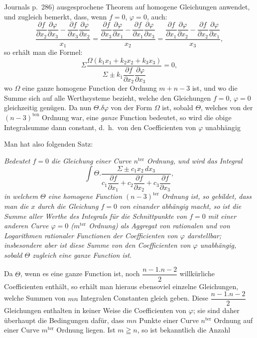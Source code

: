 \documentclass{article}
\begin{document}
Journals p.\ 286) ausgesprochene Theorem auf homogene Gleichungen anwendet, und zugleich bemerkt, dass, wenn $f = 0$, $\varphi = 0$, auch:
\[ \frac{\dfrac{\partial f}{\partial x_{2}}\dfrac{\partial \varphi}{\partial x_{3}} - \dfrac{\partial f}{\partial x_{3}}\dfrac{\partial \varphi}{\partial x_{2}}}{x_{1}} = \frac{\dfrac{\partial f}{\partial x_{3}}\dfrac{\partial \varphi}{\partial x_{1}} - \dfrac{\partial f}{\partial x_{1}}\dfrac{\partial \varphi}{\partial x_{3}}}{x_{2}} = \frac{\dfrac{\partial f}{\partial x_{1}}\dfrac{\partial \varphi}{\partial x_{2}} - \dfrac{\partial f}{\partial x_{2}}\dfrac{\partial \varphi}{\partial x_{1}}}{x_{3}}, \]
so erhält man die Formel:
\[ \Sigma\frac{\Omega(k_{1}x_{1} + k_{2}x_{2} + k_{3}x_{3})}{\Sigma\pm k_{1}\dfrac{\partial f}{\partial x_{2}}\dfrac{\partial \varphi}{\partial x_{3}}} = 0, \]
wo $\Omega$ eine ganze homogene Function der Ordnung $m+n-3$ ist, und wo die Summe sich auf alle Werthsysteme bezieht, welche den Gleichungen $f = 0$, $\varphi = 0$ gleichzeitig genügen. Da nun $\Theta.\delta\varphi$ von der Form $\Omega$ ist, sobald $\Theta$, welches von der $(n-3)^{\text{ten}}$ Ordnung war, eine \emph{ganze} Function bedeutet, so wird die obige Integralsumme dann constant, d.\ h.\ von den Coefficienten von $\varphi$ unabhängig

Man hat also folgenden Satz:

\emph{Bedeutet $f = 0$ die Gleichung einer Curve $n^{\text{ter}}$ Ordnung, und wird das Integral}
\[ \int \Theta.\frac{\Sigma\pm c_{1}x_{2}\,dx_{3}}{c_{1}\dfrac{\partial f}{\partial x_{1}} + c_{2}\dfrac{\partial f}{\partial x_{2}} + c_{3}\dfrac{\partial f}{\partial x_{3}}}, \]
\emph{in welchem $\Theta$ eine homogene Function $(n-3)^{\text{ter}}$ Ordnung ist, so gebildet, dass man die $x$ durch die Gleichung $f = 0$ von einander abhängig macht, so ist die Summe aller Werthe des Integrals für die Schnittpunkte von $f = 0$ mit einer anderen Curve $\varphi = 0$ ($m^{\text{ter}}$ Ordnung) als Aggregat von rationalen und von Logarithmen rationaler Functionen der Coefficienten von $\varphi$ darstellbar; insbesondere aber ist diese Summe von den Coefficienten von $\varphi$ unabhängig, sobald $\Theta$ zugleich eine ganze Function ist.}

Da $\Theta$, wenn es eine ganze Function ist, noch $\dfrac{n-1.n-2}{2}$ willkürliche Coefficienten enthält, so erhält man hieraus ebensoviel einzelne Gleichungen, welche Summen von $mn$ Integralen Constanten gleich geben. Diese $\dfrac{n-1.n-2}{2}$ Gleichungen enthalten in keiner Weise die Coefficienten von $\varphi$; sie sind daher überhaupt die Bedingungen dafür, dass $mn$ Punkte einer Curve $n^{\text{ter}}$ Ordnung auf einer Curve $m^{\text{ter}}$ Ordnung liegen. Ist $m \geqq n$, so ist bekanntlich die Anzahl
\end{document}
